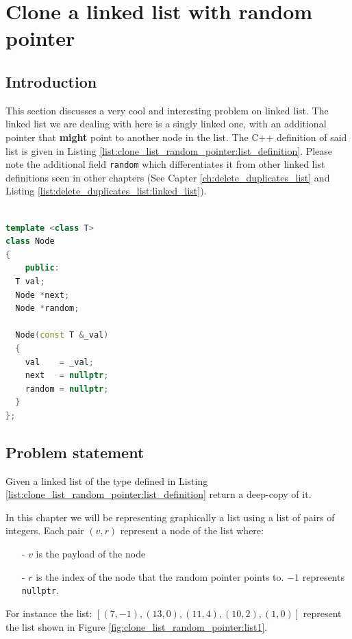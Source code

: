 %

\chapter{Clone a linked list with random pointer}
\label{ch:clone_list_random_pointer}
\section*{Introduction}
This section discusses a very cool and interesting problem on linked list. The linked list we are dealing with here is a singly linked one, with an additional pointer that \textbf{might} point to another node in the list. The C++ definition of said list is given in Listing \ref{list:clone_list_random_pointer:list_definition}. Please note the additional field \lstinline[columns=fixed]{random} which differentiates it from other linked list definitions seen in other chapters (See Capter \ref{ch:delete_duplicates_list} and Listing \ref{list:delete_duplicates_list:linked_list}).

\begin{lstlisting}[language=c++, caption={Definition of a linked list with a random pointer.},label=list:delete_duplicates_list:linked_list]

template <class T> 
class Node
{
    public:
  T val;
  Node *next;
  Node *random;

  Node(const T &_val)
  {
    val    = _val;
    next   = nullptr;
    random = nullptr;
  }
};
\end{lstlisting}

\section{Problem statement}
\begin{exercise}
Given a linked list of the type defined in Listing \ref{list:clone_list_random_pointer:list_definition} return a deep-copy of it.
\end{exercise}

In this chapter we will be representing graphically a list using a list of pairs of integers. Each pair $(v,r)$ represent a node of the list where:
\begin{itemize}
	\item[-] $v$ is the payload of the node
	\item[-] $r$ is the index of the node that the random pointer points to. $-1$ represents \lstinline[columns=fixed]{nullptr}.
\end{itemize} 
For instance the list: $[(7,-1),(13,0),(11,4),(10,2),(1,0)]$ represent the list shown in Figure \ref{fig:clone_list_random_pointer:list1}.

